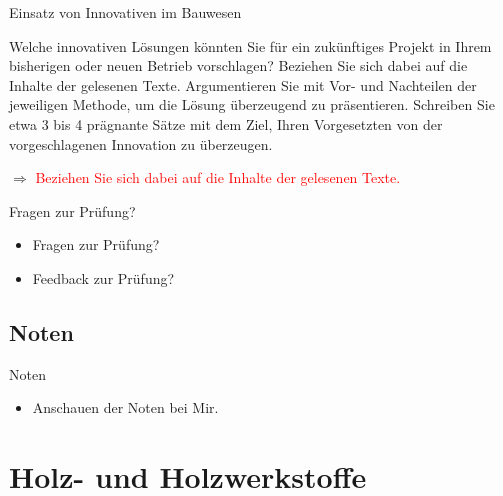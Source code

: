\begin{frame}{Einsatz von Innovativen im Bauwesen
	}
	\begin{Fragenblock}
		Welche innovativen Lösungen könnten Sie für ein zukünftiges Projekt in Ihrem bisherigen oder neuen Betrieb vorschlagen? Beziehen Sie sich dabei auf die Inhalte der gelesenen Texte. Argumentieren Sie mit Vor- und Nachteilen der jeweiligen Methode, um die Lösung überzeugend zu präsentieren. Schreiben Sie etwa 3 bis 4 prägnante Sätze mit dem Ziel, Ihren Vorgesetzten von der vorgeschlagenen Innovation zu überzeugen.
	\end{Fragenblock}
	\pause
	\vspace{1cm}
	$\Rightarrow$  \textcolor{red}{Beziehen Sie sich dabei auf die Inhalte der gelesenen Texte.}

\end{frame}

\begin{frame}{Fragen zur Prüfung?}
	\begin{itemize}
		\item[\textbullet] Fragen zur Prüfung?
		\item[\textbullet] Feedback zur Prüfung?
	\end{itemize}

\end{frame}


\subsection{Noten}
\begin{frame}{Noten}
	\begin{itemize}
		\item[\textbullet] Anschauen der Noten bei Mir.
	\end{itemize}
\end{frame}



%
%


\section{Holz- und Holzwerkstoffe}
\BlueSectionSlide
\folieFragen

